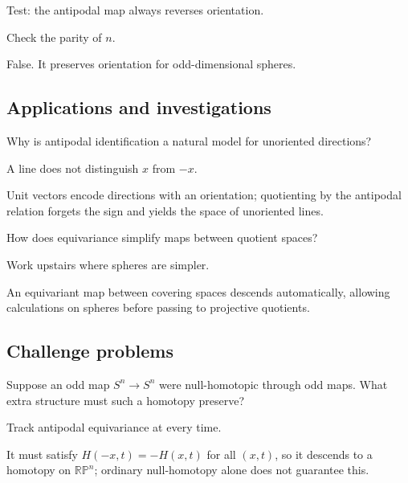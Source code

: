 \begin{exercise}\label{exr:viii04-ped-12}
Test: the antipodal map always reverses orientation.
\end{exercise}
\begin{hint}
Check the parity of $n$.
\end{hint}
\begin{solution}
False. It preserves orientation for odd-dimensional spheres.
\end{solution}

\subsection*{Applications and investigations}

\begin{exercise}\label{exr:viii04-ped-13}
Why is antipodal identification a natural model for unoriented directions?
\end{exercise}
\begin{hint}
A line does not distinguish $x$ from $-x$.
\end{hint}
\begin{solution}
Unit vectors encode directions with an orientation; quotienting by the antipodal relation forgets the sign and yields the space of unoriented lines.
\end{solution}

\begin{exercise}\label{exr:viii04-ped-14}
How does equivariance simplify maps between quotient spaces?
\end{exercise}
\begin{hint}
Work upstairs where spheres are simpler.
\end{hint}
\begin{solution}
An equivariant map between covering spaces descends automatically, allowing calculations on spheres before passing to projective quotients.
\end{solution}

\subsection*{Challenge problems}

\begin{exercise}\label{exr:viii04-ped-15}
Suppose an odd map $S^n\to S^n$ were null-homotopic through odd maps. What extra structure must such a homotopy preserve?
\end{exercise}
\begin{hint}
Track antipodal equivariance at every time.
\end{hint}
\begin{solution}
It must satisfy $H(-x,t)=-H(x,t)$ for all $(x,t)$, so it descends to a homotopy on $\mathbb{RP}^n$; ordinary null-homotopy alone does not guarantee this.
\end{solution}

